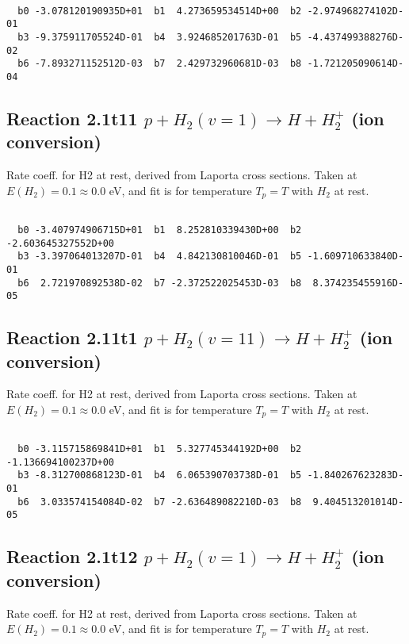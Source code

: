 \begin{small}\begin{verbatim}

  b0 -3.078120190935D+01  b1  4.273659534514D+00  b2 -2.974968274102D-01
  b3 -9.375911705524D-01  b4  3.924685201763D-01  b5 -4.437499388276D-02
  b6 -7.893271152512D-03  b7  2.429732960681D-03  b8 -1.721205090614D-04

\end{verbatim}\end{small}

\newpage
\subsection{
Reaction 2.1t11
$ p + H_2(v=1) \rightarrow H + H_2^+$ (ion conversion)
}
Rate coeff. for H2 at rest, derived from Laporta cross sections.
Taken at $E(H_2) = 0.1 \approx 0.0$ eV,  and fit is for temperature $T_p=T$ with $H_2$ at rest.

\begin{small}\begin{verbatim}

  b0 -3.407974906715D+01  b1  8.252810339430D+00  b2 -2.603645327552D+00
  b3 -3.397064013207D-01  b4  4.842130810046D-01  b5 -1.609710633840D-01
  b6  2.721970892538D-02  b7 -2.372522025453D-03  b8  8.374235455916D-05

\end{verbatim}\end{small}

\newpage
\subsection{
Reaction 2.11t1
$ p + H_2(v=11) \rightarrow H + H_2^+$ (ion conversion)
}
Rate coeff. for H2 at rest, derived from Laporta cross sections.
Taken at $E(H_2) = 0.1 \approx 0.0$ eV,  and fit is for temperature $T_p=T$ with $H_2$ at rest.

\begin{small}\begin{verbatim}

  b0 -3.115715869841D+01  b1  5.327745344192D+00  b2 -1.136694100237D+00
  b3 -8.312700868123D-01  b4  6.065390703738D-01  b5 -1.840267623283D-01
  b6  3.033574154084D-02  b7 -2.636489082210D-03  b8  9.404513201014D-05

\end{verbatim}\end{small}

\newpage
\subsection{
Reaction 2.1t12
$ p + H_2(v=1) \rightarrow H + H_2^+$ (ion conversion)
}
Rate coeff. for H2 at rest, derived from Laporta cross sections.
Taken at $E(H_2) = 0.1 \approx 0.0$ eV,  and fit is for temperature $T_p=T$ with $H_2$ at rest.

